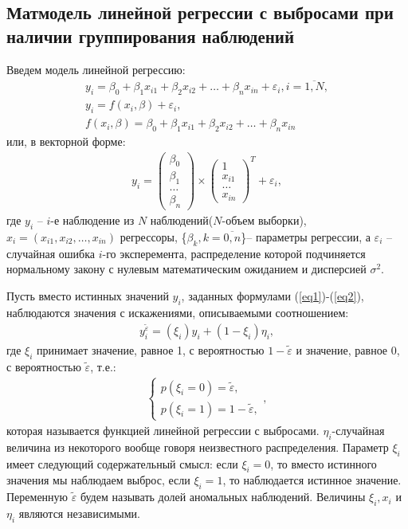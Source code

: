 \documentclass[a4paper,14pt]{extarticle}
\begin{document}
\subsection{Матмодель линейной регрессии с выбросами при наличии группирования наблюдений}
Введем модель линейной регрессию:\hfill\break
\begin{equation}
\begin{array}{c}
    \label{eq1}y_i=\beta_0+\beta_1 x_{i1}+\beta_2 x_{i2}+\dots+\beta_n x_{in}+\varepsilon_i, i=\overline{1,N},\\
    y_i= f(x_i,\beta)+\varepsilon_i,\\
    f(x_i,\beta)=\beta_0+\beta_1 x_{i1}+\beta_2 x_{i2}+\dots+\beta_n x_{in}
\end{array}
\end{equation}
или, в векторной форме:
\begin{eqnarray}
    \label{eq2}y_i= 
    \begin{pmatrix}
        \beta_0\\
        \beta_1\\
        \dots\\
        \beta_n
    \end{pmatrix}\times
    \begin{pmatrix}
        1\\
        x_{i1}\\
        \dots\\
        x_{in}
    \end{pmatrix}^{T}+ \varepsilon_i,
\end{eqnarray}
где $y_i$ -- $i$-е наблюдение из $N$ наблюдений($N$-объем выборки), $x_i=(x_{i1},x_{i2},\dots,x_{in})$ регрессоры, \{$\beta_k, k=\overline{0,n}$\}-- параметры регрессии, а $\varepsilon_i$ -- случайная ошибка $i$-го эксперемента, распределение которой подчиняется нормальному закону с нулевым математическим ожиданием и дисперсией $\sigma^2$.

Пусть вместо истинных значений $y_i$, заданных формулами (\ref{eq1})-(\ref{eq2}), 
наблюдаются значения с искажениями, описываемыми соотношением:
\begin{eqnarray}
    \label{eq3}y_i^{\widetilde{\varepsilon}}=(\xi_i)y_i+ (1-\xi_i)\eta_i,
\end{eqnarray}
где $\xi_i$ принимает значение, равное 1, с вероятностью $1-\widetilde{\varepsilon}$ и значение, равное 0, с вероятностью $\widetilde{\varepsilon}$, т.е.:
\begin{eqnarray}\label{eq4}
    \begin{cases}
        p(\xi_i=0)=\widetilde{\varepsilon},\\
        p(\xi_i=1)=1-\widetilde{\varepsilon},
    \end{cases},
\end{eqnarray}
которая называется функцией линейной регрессии с выбросами. $\eta_i$-случайная величина из некоторого вообще говоря неизвестного распределения.
Параметр $\xi_i$ имеет следующий содержательный смысл: если $\xi_i=0$, то вместо истинного значения мы наблюдаем выброс, если $\xi_i=1$, то наблюдается истинное значение.
Переменную $\widetilde{\varepsilon}$ будем называть долей аномальных наблюдений. Величины $\xi_i, x_i$ и $\eta_i$ являются независимыми.
\end{document}
